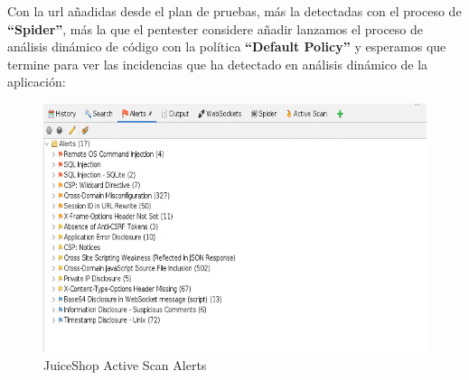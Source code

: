 Con la url añadidas desde el plan de pruebas, más la detectadas con el proceso de \textbf{“Spider”}, más la que el pentester 
considere añadir lanzamos el proceso de análisis dinámico de código con  la política \textbf{“Default Policy”} y esperamos
que termine para ver las incidencias que ha detectado en análisis dinámico de la aplicación:\\

\begin{figure}[!htb]
    \captionsetup{width=1\linewidth}  
    \includegraphics[width=\linewidth]{./imagenes/04_1_3_04_JuiceShop_ZapProxyActiveScanResult.png}
    \caption{JuiceShop Active Scan Alerts}  
    \label{fig:JuiceShop Active Scan Alerts}
\end{figure}

\clearpage



